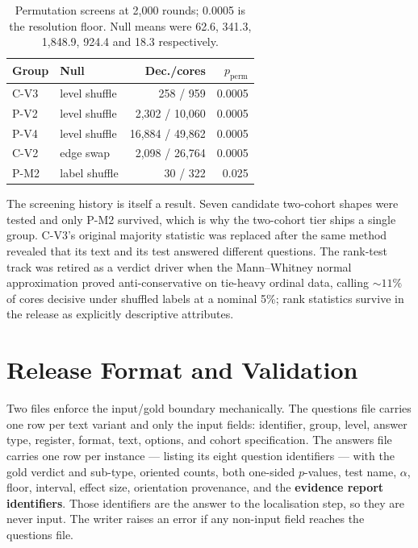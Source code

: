 \begin{table}[t]
\centering
\small
\begin{tabular}{llrr}
\toprule
Group & Null & Dec./cores & $p_{\textrm{perm}}$ \\
\midrule
C-V3 & level shuffle & 258 / 959 & 0.0005 \\
P-V2 & level shuffle & 2{,}302 / 10{,}060 & 0.0005 \\
P-V4 & level shuffle & 16{,}884 / 49{,}862 & 0.0005 \\
C-V2 & edge swap & 2{,}098 / 26{,}764 & 0.0005 \\
P-M2 & label shuffle & 30 / 322 & 0.025 \\
\bottomrule
\end{tabular}
\caption{Permutation screens at 2{,}000 rounds; 0.0005 is the resolution floor.
Null means were 62.6, 341.3, 1{,}848.9, 924.4 and 18.3 respectively.}
\label{tab:screens}
\end{table}

The screening history is itself a result. Seven candidate two-cohort shapes were
tested and only P-M2 survived, which is why the two-cohort tier ships a single
group. C-V3's original majority statistic was replaced after the same method
revealed that its text and its test answered different questions. The rank-test
track was retired as a verdict driver when the Mann--Whitney normal approximation
proved anti-conservative on tie-heavy ordinal data, calling ${\sim}11\%$ of cores
decisive under shuffled labels at a nominal 5\%; rank statistics survive in the
release as explicitly descriptive attributes.

\section{Release Format and Validation}
\label{sec:release}

Two files enforce the input/gold boundary mechanically. The questions file
carries one row per text variant and only the input fields: identifier, group,
level, answer type, register, format, text, options, and cohort specification.
The answers file carries one row per instance --- listing its eight question
identifiers --- with the gold verdict and sub-type, oriented counts, both
one-sided $p$-values, test name, $\alpha$, floor, interval, effect size,
orientation provenance, and the \textbf{evidence report identifiers}. Those
identifiers are the answer to the localisation step, so they are never input. The
writer raises an error if any non-input field reaches the questions file.

